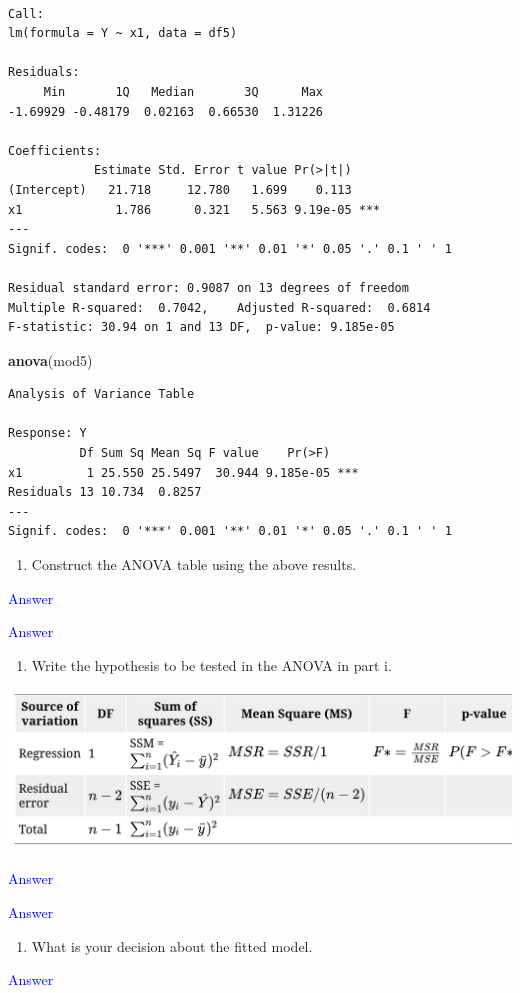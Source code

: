 \documentclass[]{article}
\newenvironment{Shaded}{\begin{snugshade}}{\end{snugshade}}
\newcommand{\KeywordTok}[1]{\textcolor[rgb]{0.13,0.29,0.53}{\textbf{#1}}}
\newcommand{\NormalTok}[1]{#1}
\providecommand{\tightlist}{%
  \setlength{\itemsep}{0pt}\setlength{\parskip}{0pt}}
\begin{document}
\begin{verbatim}

Call:
lm(formula = Y ~ x1, data = df5)

Residuals:
     Min       1Q   Median       3Q      Max 
-1.69929 -0.48179  0.02163  0.66530  1.31226 

Coefficients:
            Estimate Std. Error t value Pr(>|t|)    
(Intercept)   21.718     12.780   1.699    0.113    
x1             1.786      0.321   5.563 9.19e-05 ***
---
Signif. codes:  0 '***' 0.001 '**' 0.01 '*' 0.05 '.' 0.1 ' ' 1

Residual standard error: 0.9087 on 13 degrees of freedom
Multiple R-squared:  0.7042,    Adjusted R-squared:  0.6814 
F-statistic: 30.94 on 1 and 13 DF,  p-value: 9.185e-05
\end{verbatim}

\begin{Shaded}
\begin{Highlighting}[]
\KeywordTok{anova}\NormalTok{(mod5)}
\end{Highlighting}
\end{Shaded}

\begin{verbatim}
Analysis of Variance Table

Response: Y
          Df Sum Sq Mean Sq F value    Pr(>F)    
x1         1 25.550 25.5497  30.944 9.185e-05 ***
Residuals 13 10.734  0.8257                      
---
Signif. codes:  0 '***' 0.001 '**' 0.01 '*' 0.05 '.' 0.1 ' ' 1
\end{verbatim}

\begin{enumerate}
\def\labelenumi{\roman{enumi})}
\tightlist
\item
  Construct the ANOVA table using the above results.
\end{enumerate}

\textcolor{blue}{Answer}

\newpage

\textcolor{blue}{Answer}

\newpage

\begin{enumerate}
\def\labelenumi{\roman{enumi})}
\setcounter{enumi}{1}
\tightlist
\item
  Write the hypothesis to be tested in the ANOVA in part i.
\end{enumerate}

\includegraphics{ANOVA.png}

\textcolor{blue}{Answer}

\newpage

\textcolor{blue}{Answer}

\begin{enumerate}
\def\labelenumi{\roman{enumi})}
\setcounter{enumi}{2}
\tightlist
\item
  What is your decision about the fitted model.
\end{enumerate}

\newpage

\textcolor{blue}{Answer}
\end{document}

